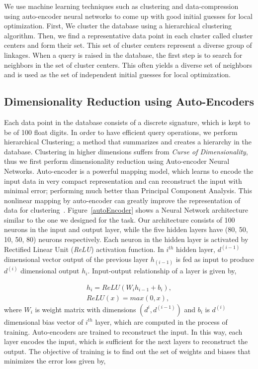 \documentclass[twocolumn,10pt]{asme2ej}
\begin{document}
We use machine learning techniques such as clustering and data-compression using auto-encoder neural networks to come up with good initial guesses for local optimization.
First, We cluster the database using a hierarchical clustering algorithm.
Then, we find a representative data point in each cluster called cluster centers and form their set.
This set of cluster centers represent a diverse group of linkages.
When a query is raised in the database, the first step is to search for neighbors in the set of cluster centers.
This often yields a diverse set of neighbors and is used as the set of independent initial guesses for local optimization.

\subsection{Dimensionality Reduction using Auto-Encoders}
Each data point in the database consists of a discrete signature, which is kept to be of 100 float digits.
In order to have efficient query operations, we perform hierarchical Clustering; a method that summarizes and creates a hierarchy in the database.
Clustering in higher dimensions suffers from \emph{Curse of Dimensionality}\cite{marimont1979}, thus we first perform dimensionality reduction using Auto-encoder Neural Networks.
Auto-encoder is a powerful mapping model, which learns to encode the input data in very compact representation and can reconstruct the input with minimal error; performing much better than Principal Component Analysis\cite{hinton2006}.
This nonlinear mapping by auto-encoder can greatly improve the representation of data for clustering~\cite{song2013}.
Figure~\ref{autoEncoder} shows a Neural Network architecture similar to the one we designed for the task.
Our architecture consists of 100 neurons in the input and output layer, while the five hidden layers have (80, 50, 10, 50, 80) neurons respectively.
Each neuron in the hidden layer is activated by Rectified Linear Unit (\emph{ReLU}) activation function.
In $i^{th}$ hidden layer, $d^{(i-1)}$ dimensional vector output of the previous layer $h_(i-1)$ is fed as input to produce $d^{(i)}$ dimensional output $h_i$.
Input-output relationship of a layer is given by,

\begin{eqnarray}\label{nnlayer}
  h_i = ReLU(W_{i}h_{i-1} + b_{i}), \\
  ReLU(x) = max(0, x),
\end{eqnarray}
where $W_i$ is weight matrix with dimensions $(d^{i}, d^{(i-1)})$ and $b_i$ is $d^{(i)}$ dimensional bias vector of $i^{th}$ layer, which are computed in the process of training.
Auto-encoders are trained to reconstruct the input.
In this way, each layer encodes the input, which is sufficient for the next layers to reconstruct the output.
The objective of training is to find out the set of weights and biases that minimizes the error loss given by,
\end{document}
